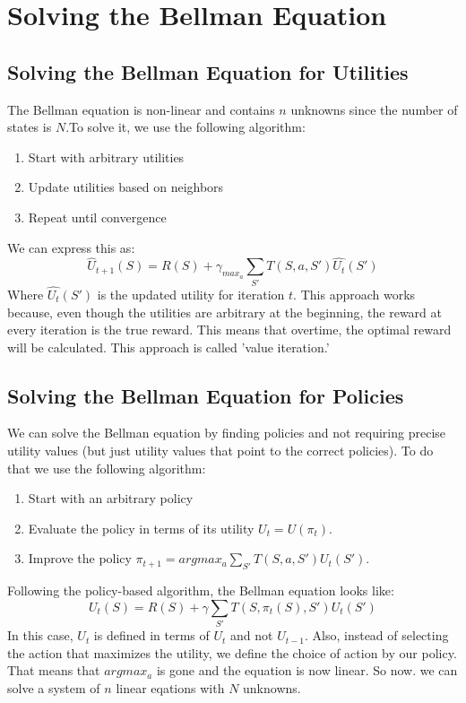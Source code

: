 \documentclass{article}
\begin{document}
\section{Solving the Bellman Equation}
\subsection{Solving the Bellman Equation for Utilities}
The Bellman equation is non-linear and contains $n$ unknowns since the number of states is $N$.To solve it, we use the following algorithm:
\begin{enumerate}
  \item Start with arbitrary utilities
  \item Update utilities based on neighbors
  \item Repeat until convergence
\end{enumerate}
We can express this as:
\begin{equation}
  \hat{U}_{t + 1}(S) = R(S) + \gamma_{max_a} \sum_{S'} T(S, a, S') \hat{U_t}(S')
\end{equation}
Where $\hat{U_t}(S')$ is the updated utility for iteration $t$. This approach works because, even though the utilities are arbitrary at the beginning, the reward at every iteration is the true reward. This means that overtime, the optimal reward will be calculated. This approach is called 'value iteration.'
\subsection{Solving the Bellman Equation for Policies}
We can solve the Bellman equation by finding policies and not requiring precise utility values (but just utility values that point to the correct policies). To do that we use the following algorithm:
\begin{enumerate}
  \item Start with an arbitrary policy
  \item Evaluate the policy in terms of its utility $U_t = U(\pi_t)$.
  \item Improve the policy $\pi_{t + 1} = argmax_a \sum_{S'} T(S, a, S') U_t(S')$.
\end{enumerate}
Following the policy-based algorithm, the Bellman equation looks like:
\begin{equation}
  U_t(S) = R(S) + \gamma \sum_{S'} T(S, \pi_t(S), S') U_t(S')
\end{equation}
In this case, $U_t$ is defined in terms of $U_t$ and not $U_{t - 1}$. Also, instead of selecting the action that maximizes the utility, we define the choice of action by our policy. That means that $argmax_a$ is gone and the equation is now linear. So now. we can solve a system of $n$ linear eqations with $N$ unknowns.
\end{document}
